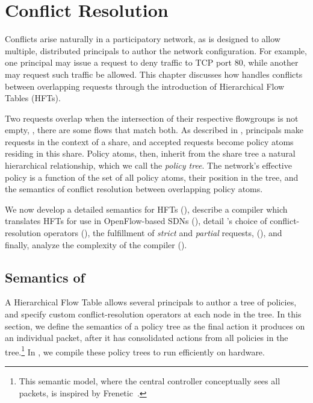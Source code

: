 \chapter{Conflict Resolution}
\label{sec:conflicts}

Conflicts arise naturally in a participatory network, as \sys is
designed to allow multiple, distributed principals to author the network configuration.
For example, one principal may issue a request to deny traffic to
TCP port 80, while another may request  such traffic be allowed.
This chapter discusses how \sys handles conflicts between overlapping requests
through the introduction of Hierarchical Flow Tables (HFTs).

Two requests overlap when the intersection of their
respective flowgroups is not empty, \ie, there are some flows that
match both.  As described in , principals
make requests in the context of a share, and accepted requests
become policy atoms residing in this share. Policy atoms, then,
inherit from the share tree a natural hierarchical relationship,
which we call the \emph{policy tree}. The network's effective policy is a function
of the set of all policy atoms, their position in the tree, and the
semantics of conflict resolution between overlapping policy atoms.

We now develop a detailed semantics for HFTs (),
describe a compiler which translates HFTs for use in OpenFlow-based SDNs (\label{s:lin}), 
detail \sys's choice of conflict-resolution operators (),
the fulfillment of \emph{strict} and \emph{partial} requests, (),
and finally, analyze the complexity of the \treelang compiler ().

\section{Semantics of \treelang}
\label{sec:Implementation}

A Hierarchical Flow Table allows several principals to author a tree of policies, and
specify custom conflict-resolution operators at each node in the
tree. In this section, we define the semantics of a policy tree as the
final action it produces on an individual packet, after it has
consolidated actions from all policies in the tree.\footnote{This
  semantic model, where the central controller conceptually sees all
  packets, is inspired by Frenetic~\cite{Foster:2010}.}
In , we compile these policy trees to run efficiently on hardware.

